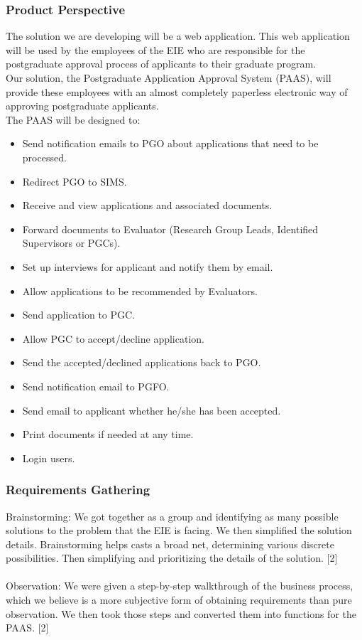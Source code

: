 \documentclass{article}
\begin{document}
\subsubsection{Product Perspective}
The solution we are developing will be a web application. This web application will be used by the employees of the EIE who are responsible for the postgraduate approval process of applicants to their graduate program. \\
Our solution, the Postgraduate Application Approval System (PAAS), will provide these employees with an almost completely paperless electronic way of approving postgraduate applicants. \\
The PAAS will be designed to:
\begin{itemize}
\item Send notification emails to PGO about applications that need to be processed.
\item Redirect PGO to SIMS.
\item Receive and view applications and associated documents.
\item Forward documents to Evaluator (Research Group Leads, Identified Supervisors or PGCs).
\item Set up interviews for applicant and notify them by email.
\item Allow applications to be recommended by Evaluators.
\item Send application to PGC.
\item Allow PGC to accept/decline application.
\item Send the accepted/declined applications back to PGO.
\item Send notification email to PGFO.
\item Send email to applicant whether he/she has been accepted.
\item Print documents if needed at any time.
\item Login users.
\end{itemize}
\subsubsection{Requirements Gathering}
Brainstorming: We got together as a group and identifying as many possible solutions to the problem that the EIE is facing. We then simplified the solution details. Brainstorming helps casts a broad net, determining various discrete possibilities. Then simplifying and prioritizing the details of the solution. [2] \\ \\
Observation: We were given a step-by-step walkthrough of the business process, which we believe is a more subjective form of obtaining requirements than pure observation. We then took those steps and converted them into functions for the PAAS. [2]
\end{document}
